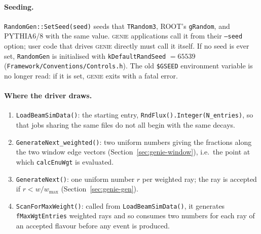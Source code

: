 \documentclass[11pt]{article}
\newcommand{\code}[1]{\texttt{#1}}
\newcommand{\genie}{\textsc{genie}\xspace}
\newcommand{\sect}[1]{Section~\ref{sec:#1}}
\begin{document}
\paragraph{Seeding.}  \code{RandomGen::SetSeed(seed)} seeds that
\code{TRandom3}, ROOT's \code{gRandom}, and PYTHIA6/8 with the same value.
\genie applications call it from their \code{--seed} option; user code that
drives \genie directly must call it itself.  If no seed is ever set,
\code{RandomGen} is initialised with \code{kDefaultRandSeed} $= 65539$
(\code{Framework/Conventions/Controls.h}).  The old \code{\$GSEED}
environment variable is no longer read: if it is set, \genie exits with a
fatal error.

\paragraph{Where the driver draws.}
\begin{enumerate}[nosep]
\item \code{LoadBeamSimData()}: the starting entry,
      \code{RndFlux().Integer(N\_entries)}, so that jobs sharing the same
      files do not all begin with the same decays.
\item \code{GenerateNext\_weighted()}: two uniform numbers giving the
      fractions along the two window edge vectors (\sect{genie-window}),
      i.e.\ the point at which \code{calcEnuWgt} is evaluated.
\item \code{GenerateNext()}: one uniform number $r$ per weighted ray; the
      ray is accepted if $r < w/w_\mathrm{max}$ (\sect{genie-gen}).
\item \code{ScanForMaxWeight()}: called from \code{LoadBeamSimData()}, it
      generates \code{fMaxWgtEntries} weighted rays and so consumes two
      numbers for each ray of an accepted flavour before any event is
      produced.
\end{enumerate}
\end{document}
